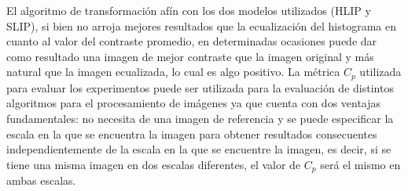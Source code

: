 \begin{conclusions}
    El algoritmo de transformaci\'on af\'in con los dos modelos utilizados (HLIP y SLIP), si bien no arroja mejores resultados que la ecualizaci\'on del histograma en cuanto al valor del contraste promedio, en determinadas ocasiones puede dar como resultado una imagen de mejor contraste que la imagen original y m\'as natural que la imagen ecualizada, lo cual es algo positivo. La m\'etrica $C_p$ utilizada para evaluar los experimentos puede ser utilizada para la evaluaci\'on de distintos algoritmos para el procesamiento de im\'agenes ya que cuenta con dos ventajas fundamentales: no necesita de una imagen de referencia y se puede especificar la escala en la que se encuentra la imagen para obtener resultados consecuentes independientemente de la escala en la que se encuentre la imagen, es decir, si se tiene una misma imagen en dos escalas diferentes, el valor de $C_p$ ser\'a el mismo en ambas escalas.
\end{conclusions}
